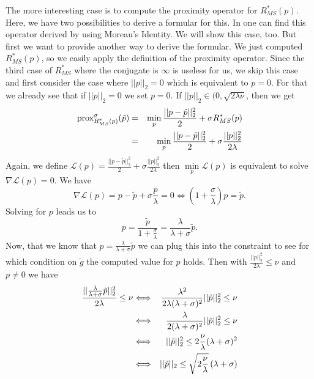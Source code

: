         The more interesting case is to compute the proximity operator for $R_{MS}^{\ast}(p)$. Here, we have two possibilities to derive a formular for this. In \cite{Strekalovskiy-Cremers-eccv14} one can find this operator derived by using Moreau's Identity. We will show this case, too. But first we want to provide another way to derive the formular. We just computed $R_{MS}^{\ast}(p)$, so we easily apply the definition of the proximity operator. Since the third case of $R_{MS}^{\ast}$ where the conjugate is $\infty$ is useless for us, we skip this case and first consider the case where $||p||_{2} = 0$ which is equivalent to $p = 0$. For that we already see that if $||p||_{2} = 0$ we set $p = 0$. If $||p||_{2} \in (0, \sqrt{2 \lambda \nu}$, then we get
            \begin{eqnarray}
                \textnormal{prox}_{R_{MS}^{\ast}(p)}^{\sigma}(\tilde{p}) &=& \min_{p} \frac{||p - \tilde{p}||_{2}^{2}}{2} + \sigma R_{MS}^{\ast}(p) \notag \\
                &=& \min_{p} \frac{||p - \tilde{p}||_{2}^{2}}{2} + \sigma \frac{||p||_{2}^{2}}{2\lambda} \notag
            \end{eqnarray}
        Again, we define $\mathcal{L}(p) = \frac{||p - \tilde{p}||_{2}^{2}}{2} + \sigma \frac{||p||_{2}^{2}}{2\lambda}$ then $\min\limits_{p} \mathcal{L}(p)$ is equivalent to solve $\nabla \mathcal{L}(p) = 0$. We have
            $$
                \nabla \mathcal{L}(p) = p - \tilde{p} + \sigma \frac{p}{\lambda} = 0 \Longleftrightarrow (1 + \frac{\sigma}{\lambda}) p = \tilde{p}.
            $$
        Solving for $p$ leads us to
            $$
                p = \frac{\tilde{p}}{1 + \frac{\sigma}{\lambda}} = \frac{\lambda}{\lambda + \sigma} \tilde{p}.
            $$
        Now, that we know that $p = \frac{\lambda}{\lambda + \sigma} \tilde{p}$ we can plug this into the constraint to see for which condition on $\tilde{g}$ the computed value for $p$ holds. Then with $\frac{||p||_{2}^{2}}{2\lambda} \le \nu$ and $p \ne 0$ we have
            \begin{eqnarray}
                \frac{||\frac{\lambda}{\lambda + \sigma} \tilde{p}||_{2}^{2}}{2\lambda} \le \nu &\Longleftrightarrow& \frac{\lambda^{2}}{2\lambda(\lambda + \sigma)^{2}} ||\tilde{p}||_{2}^{2} \le \nu \notag \\
                &\Longleftrightarrow& \frac{\lambda}{2(\lambda + \sigma)^{2}} ||\tilde{p}||_{2}^{2} \le \nu \notag \\
                &\Longleftrightarrow& ||\tilde{p}||_{2}^{2} \le 2 \frac{\nu}{\lambda} (\lambda + \sigma)^{2} \notag \\
                &\Longleftrightarrow& ||\tilde{p}||_{2} \le \sqrt{2 \frac{\nu}{\lambda}} \, (\lambda + \sigma) \notag
            \end{eqnarray}
